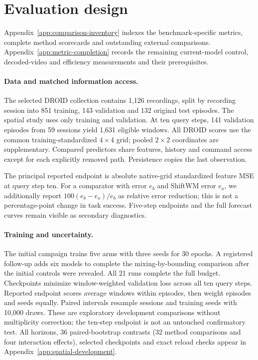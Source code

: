 \section{Evaluation design}
\label{sec:editorial-evaluation}
Appendix~\ref{app:comparison-inventory} indexes the benchmark-specific metrics,
complete method scorecards and outstanding external comparisons.
Appendix~\ref{app:metric-completion} records the remaining current-model control,
decoded-video and efficiency measurements and their prerequisites.
\paragraph{Data and matched information access.}
The selected DROID collection contains 1,126 recordings, split by recording
session into 851 training, 143 validation and 132 original test episodes.
The spatial study uses only training and validation. At ten query steps,
141 validation episodes from 59 sessions yield 1,631 eligible windows.
All DROID scores use the common training-standardized $4\times4$ grid;
pooled $2\times2$ coordinates are supplementary. Compared predictors share
features, history and command access except for each explicitly removed path.
Persistence copies the last observation.

The principal reported endpoint is absolute native-grid standardized feature MSE
at query step ten. For a comparator with error $e_b$ and ShiftWM error $e_o$,
we additionally report $100(e_b-e_o)/e_b$ as relative error reduction; this is not a
percentage-point change in task success. Five-step endpoints and the full
forecast curves remain visible as secondary diagnostics.

\paragraph{Training and uncertainty.}
The initial campaign trains five arms with three seeds for 30 epochs.
A registered follow-up adds six models to complete the mixing-by-bounding
comparison after the initial controls were revealed. All 21 runs complete
the full budget. Checkpoints minimize window-weighted validation loss across
all ten query steps. Reported endpoint scores average windows within episodes,
then weight episodes and seeds equally. Paired intervals resample sessions
and training seeds with 10,000 draws. These are exploratory development
comparisons without multiplicity correction; the ten-step endpoint is not
an untouched confirmatory test. All horizons, 36 paired-bootstrap contrasts
(32 method comparisons and four interaction effects), selected checkpoints
and exact reload checks appear in Appendix~\ref{app:spatial-development}.

